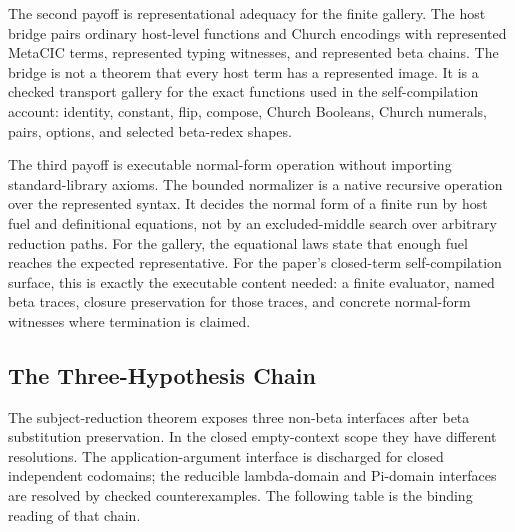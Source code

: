 The second payoff is representational adequacy for the finite gallery.  The
host bridge pairs ordinary host-level functions and Church encodings with
represented MetaCIC terms, represented typing witnesses, and represented beta
chains.  The bridge is not a theorem that every host term has a represented
image.  It is a checked transport gallery for the exact functions used in the
self-compilation account: identity, constant, flip, compose, Church Booleans,
Church numerals, pairs, options, and selected beta-redex shapes.


The third payoff is executable normal-form operation without importing
standard-library axioms.  The bounded normalizer is a native recursive
operation over the represented syntax.  It decides the normal form of a finite
run by host fuel and definitional equations, not by an excluded-middle search
over arbitrary reduction paths.  For the gallery, the equational laws state
that enough fuel reaches the expected representative.  For the paper's
closed-term self-compilation surface, this is exactly the executable content
needed: a finite evaluator, named beta traces, closure preservation for those
traces, and concrete normal-form witnesses where termination is claimed.

\subsection{The Three-Hypothesis Chain}
\label{subsec:closed-term-three-hypothesis-chain}

The subject-reduction theorem exposes three non-beta interfaces after beta
substitution preservation.  In the closed empty-context scope they have
different resolutions.  The application-argument interface is discharged for
closed independent codomains; the reducible lambda-domain and Pi-domain
interfaces are resolved by checked counterexamples.  The following table is
the binding reading of that chain.

